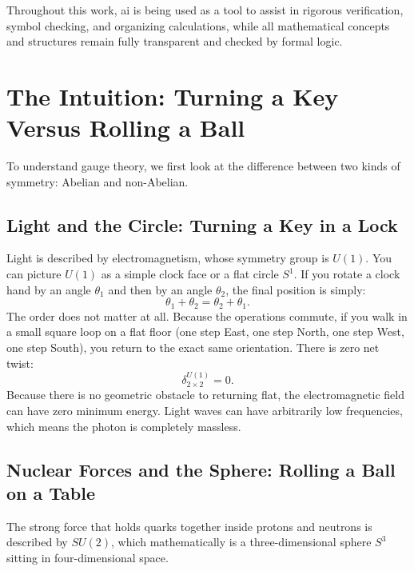 \documentclass[11pt,a4paper]{article}
\theoremstyle{definition}
\begin{document}
Throughout this work, ai is being used as a tool to assist in rigorous verification, symbol checking, and organizing calculations, while all mathematical concepts and structures remain fully transparent and checked by formal logic.

\section{The Intuition: Turning a Key Versus Rolling a Ball}

To understand gauge theory, we first look at the difference between two kinds of symmetry: Abelian and non-Abelian.

\subsection{Light and the Circle: Turning a Key in a Lock}
Light is described by electromagnetism, whose symmetry group is $U(1)$. You can picture $U(1)$ as a simple clock face or a flat circle $S^1$. If you rotate a clock hand by an angle $\theta_1$ and then by an angle $\theta_2$, the final position is simply:
\begin{equation}
\theta_1 + \theta_2 = \theta_2 + \theta_1.
\end{equation}
The order does not matter at all. Because the operations commute, if you walk in a small square loop on a flat floor (one step East, one step North, one step West, one step South), you return to the exact same orientation. There is zero net twist:
\begin{equation}
\delta_{2 \times 2}^{U(1)} = 0.
\end{equation}
Because there is no geometric obstacle to returning flat, the electromagnetic field can have zero minimum energy. Light waves can have arbitrarily low frequencies, which means the photon is completely massless.

\subsection{Nuclear Forces and the Sphere: Rolling a Ball on a Table}
The strong force that holds quarks together inside protons and neutrons is described by $SU(2)$, which mathematically is a three-dimensional sphere $S^3$ sitting in four-dimensional space.
\end{document}
